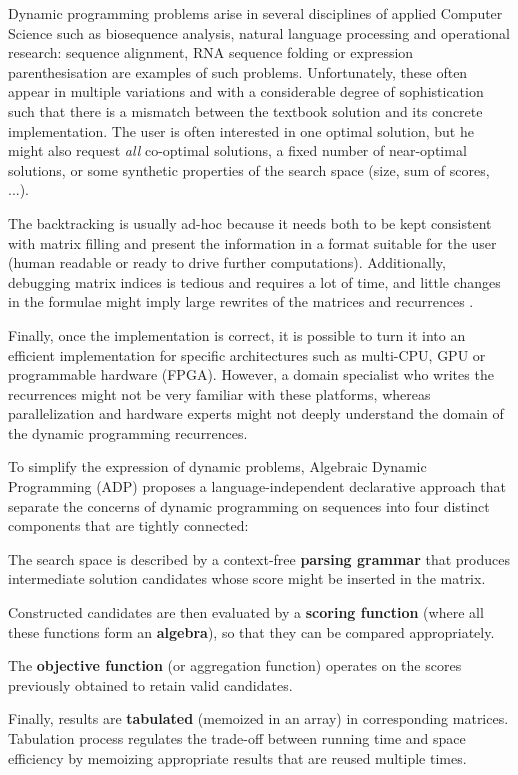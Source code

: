 Dynamic programming problems arise in several disciplines of applied Computer Science such as biosequence analysis, natural language processing and operational research: sequence alignment, RNA sequence folding or expression parenthesisation are examples of such problems. Unfortunately, these often appear in multiple variations and with a considerable degree of sophistication such that there is a mismatch between the textbook solution and its concrete implementation. The user is often interested in one optimal solution, but he might also request \textit{all} co-optimal solutions, a fixed number of near-optimal solutions, or some synthetic properties of the search space (size, sum of scores, ...).

The backtracking is usually ad-hoc because it needs both to be kept consistent with matrix filling and present the information in a format suitable for the user (human readable or ready to drive further computations). Additionally, debugging matrix indices is tedious and requires a lot of time, and little changes in the formulae might imply large rewrites of the matrices and recurrences \cite{gapc_yield}.

Finally, once the implementation is correct, it is possible to turn it into an efficient implementation for specific architectures such as multi-CPU, GPU or programmable hardware (FPGA). However, a domain specialist who writes the recurrences might not be very familiar with these platforms, whereas parallelization and hardware experts might not deeply understand the domain of the dynamic programming recurrences.

\newpage
To simplify the expression of dynamic problems, Algebraic Dynamic Programming (ADP) \cite{adp} proposes a language-independent declarative approach that separate the concerns of dynamic programming on sequences into four distinct components that are tightly connected:\ol
\item The search space is described by a context-free \textbf{parsing grammar} that produces intermediate solution candidates whose score might be inserted in the matrix.
\item Constructed candidates are then evaluated by a \textbf{scoring function} (where all these functions form an \textbf{algebra}), so that they can be compared appropriately.
\item The \textbf{objective function} (or aggregation function) operates on the scores previously obtained to retain valid candidates.
\item Finally, results are \textbf{tabulated} (memoized in an array) in corresponding matrices. Tabulation process regulates the trade-off between running time and space efficiency by memoizing appropriate results that are reused multiple times.
\ole

